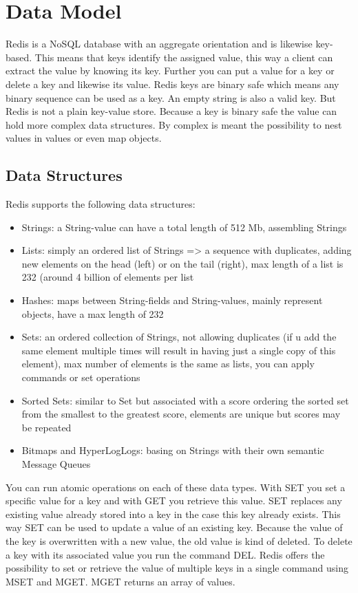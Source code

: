 \chapter{Data Model}

Redis is a NoSQL database with an aggregate orientation and is likewise key-based. This means that keys identify the assigned value, this way a client can extract the value by knowing its key. Further you can put a value for a key or delete a key and likewise its value. Redis keys are binary safe which means any binary sequence can be used as a key. An empty string is also a valid key. But Redis is not a plain key-value store. Because a key is binary safe the value can hold more complex data structures. By complex is meant the possibility to nest values in values or even map objects. 

\section{Data Structures}
Redis supports the following data structures:
\begin{itemize}  
\item Strings: a String-value can have a total length of 512 Mb, assembling Strings
\item Lists: simply an ordered list of Strings => a sequence with duplicates, adding 	new elements on the head (left) or on the tail (right), max length of a list is 232 (around 4 billion of elements per list
\item Hashes: maps between String-fields and String-values, mainly represent objects, have a max length of 232
\item Sets: an ordered collection of Strings, not allowing duplicates (if u add the 	same element multiple times will result in having just a single copy of this element), max number of elements is the same as lists, you can apply commands or set operations
\item Sorted Sets: similar to Set but associated with a score ordering the sorted set from the smallest to the greatest score, elements are unique but scores may be repeated
\item Bitmaps and HyperLogLogs: basing on Strings with their own semantic
Message Queues 	
\end{itemize}

You can run atomic operations on each of these data types. With SET you set a specific value for a key and with GET you retrieve this value. SET replaces any existing value already stored into a key in the case this key already exists. This way SET can be used to update a value of an existing key. Because the value of the key is overwritten with a new value, the old value is kind of deleted. To delete a key with its associated value you run the command DEL. Redis offers the possibility to set or retrieve the value of multiple keys in a single command using MSET and MGET. MGET returns an array of values.

